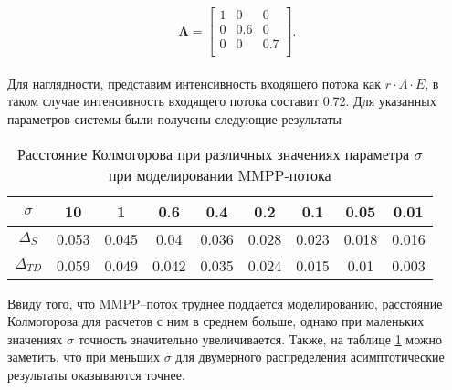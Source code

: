  \begin{equation*}
 	\boldsymbol{\Lambda}=\begin{bmatrix}
 		1 &	0 & 0\\
 		0 &	0.6 & 0\\
 		0 &	0 & 0.7\\
 	\end{bmatrix}.
 \end{equation*}
\\
Для наглядности, представим интенсивность входящего потока как $r\cdot\Lambda\cdot E$, в таком случае интенсивность входящего потока составит 0.72. Для указанных параметров системы были получены следующие результаты
\begin{table}[h!] 
	\centering
	\caption{Расстояние Колмогорова при различных значениях параметра $\sigma$ при моделировании MMPP-потока}
	\label{table_map_summary}
	\begin{tabular}{| c | c | c | c | c | c | c | c | c |}
		\hline
		$\sigma$ & 10 & 1 & 0.6 & 0.4 & 0.2 & 0.1 & 0.05 & 0.01 \\ 
		\hline
		$\Delta_S$ & 0.053 & 0.045 & 0.04 & 0.036 & 0.028 & 0.023 & 0.018 & 0.016\\
		\hline
		$\Delta_{TD}$ & 0.059 & 0.049 & 0.042 & 0.035 & 0.024 & 0.015 & 0.01 & 0.003\\
		\hline
	\end{tabular}
\end{table}

Ввиду того, что MMPP--поток труднее поддается моделированию, расстояние Колмогорова для расчетов с ним в среднем больше, однако при маленьких значениях $\sigma$ точность значительно увеличивается. Также, на таблице \ref{table_map_summary} можно заметить, что при меньших $\sigma$ для двумерного распределения асимптотические результаты оказываются точнее.

